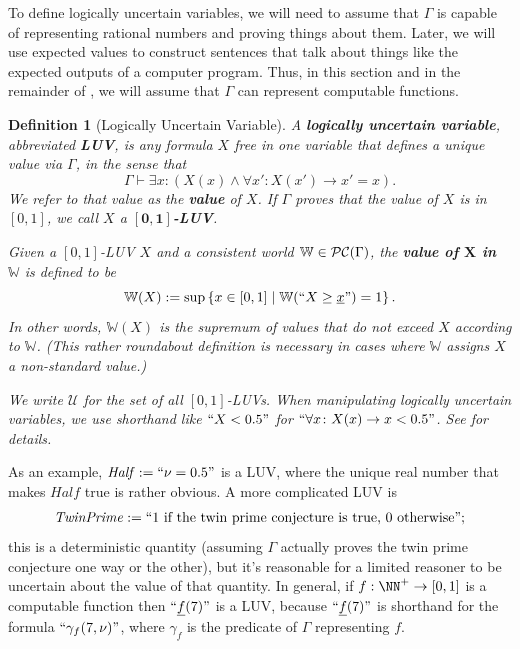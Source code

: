 \documentclass[authordate,onecolumn,noenvironments]{miri-tech-article}
\newtheorem{definition}[theorem]{Definition}
\numberwithin{equation}{subsection}
\newcommand{\quot}[1]{``#1"}
\newcommand{\enc}[1]{{\underline{#1}}}
\newcommand{\LUVs}{\mathcal{U}}%
\newcommand{\representscomputations}{can represent computable functions}
\newcommand{\cworlds}{\mathcal{P\-C}} %
\newcommand{\World}{\mathbb{W}}
\newcommand{\Theory}{\Gamma}
\begin{document}
To define logically uncertain variables, we will need to assume that $\Theory$ is capable of representing rational numbers and proving things about them. Later, we will use expected values to construct sentences that talk about things like the expected outputs of a computer program. Thus, in this section and in the remainder of , we will assume that $\Theory$ \representscomputations.

\begin{definition}[Logically Uncertain Variable]\label{def:luv}
  A \textbf{logically uncertain variable}, abbreviated \textbf{LUV}, is any formula $X$ free in one variable that defines a unique value via $\Theory$, in the sense that
  \[
    \Theory \vdash{\exists x \colon  \left( X(x) \land \forall x' \colon X(x') \to x'=x \right)}.
  \]
  We refer to that value as the \textbf{value} of $X$. If $\Theory$ proves that the value of $X$ is in $[0, 1]$, we call $X$ a \textbf{$\bm{[0,1]}$-LUV}.

  Given a $[0,1]$-LUV $X$ and a consistent world $\World \in \cworlds(\Theory)$, the \textbf{value of $\bm X$ in $\World$} is defined to be
  \[
    \World(X) := \sup \left\{x \in [0, 1] \mid \World(\quot{X \ge \enc{x}})=1 \right\}.
  \]
  In other words, $\World(X)$ is the supremum of values that do not exceed $X$ according to $\World$. (This rather roundabout definition is necessary in cases where $\World$ assigns $X$ a non-standard value.)

  We write $\LUVs$ for the set of all $[0, 1]$-LUVs. When manipulating logically uncertain variables, we use shorthand like $\quot{X < 0.5}$ for $\quot{\forall x \colon X(x) \to x < 0.5}$. See  for details.
\end{definition}

As an example, $\mathit{Half} := \quot{\nu = 0.5}$ is a LUV, where the unique real number that makes $\mathit{Half}$ true is rather obvious. A more complicated LUV is 
\[
  \mathit{TwinPrime} := \quot{\text{1 if the twin prime conjecture is true, 0 otherwise}};
\]
this is a deterministic quantity (assuming $\Theory$ actually proves the twin prime conjecture one way or the other), but it's reasonable for a limited reasoner to be uncertain about the value of that quantity. In general, if $f : \NN^+ \to [0, 1]$ is a computable function then $\quot{\enc{f}(7)}$ is a LUV, because $\quot{\enc{f}(7)}$ is shorthand for the formula $\quot{\gamma_f(7, \nu)}$, where $\gamma_f$ is the predicate of $\Theory$ representing $f$.
\end{document}
